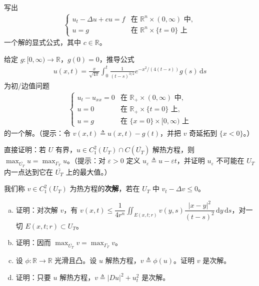 \documentclass[../../main.tex]{subfiles}
\begin{document}
\begin{exercise}\label{exercise:ch02-14}
写出
\begin{align*}
\begin{cases}
u_t-\Delta u+cu=f & \text{在 }\mathbb{R}^n\times(0,\infty)\text{ 中},\\
u=g & \text{在 }\mathbb{R}^n\times\{t=0\}\text{ 上}
\end{cases}
\end{align*}
一个解的显式公式，其中 $c\in\mathbb{R}$。
\end{exercise}

\begin{exercise}\label{exercise:ch02-15}
给定 $g:[0,\infty)\to\mathbb{R}$，$g(0)=0$，推导公式
\begin{align*}
u(x,t)=\frac{x}{\sqrt{4\pi}}\int_0^t\frac{1}{(t-s)^{3/2}}e^{-x^2/(4(t-s))}g(s)\,\mathrm{d}s
\end{align*}
为初/边值问题
\begin{align*}
\begin{cases}
u_t-u_{xx}=0 & \text{在 }\mathbb{R}_+\times(0,\infty)\text{ 中},\\
u=0 & \text{在 }\mathbb{R}_+\times\{t=0\}\text{ 上},\\
u=g & \text{在 }\{x=0\}\times[0,\infty)\text{ 上}
\end{cases}
\end{align*}
的一个解。（提示：令 $v(x,t)\triangleq u(x,t)-g(t)$，并把 $v$ 奇延拓到 $\{x<0\}$。）
\end{exercise}

\begin{exercise}\label{exercise:ch02-16}
直接证明：若 $U$ 有界，$u\in C^2_1(U_T)\cap C(\overline{U_T})$ 解热方程，则 $\max_{\overline{U_T}}u=\max_{\Gamma_T}u$。（提示：对 $\varepsilon>0$ 定义 $u_\varepsilon\triangleq u-\varepsilon t$，并证明 $u_\varepsilon$ 不可能在 $U_T$ 内一点达到它在 $\overline{U_T}$ 上的最大值。）
\end{exercise}

\begin{exercise}\label{exercise:ch02-17}
我们称 $v\in C^2_1(U_T)$ 为热方程的\textbf{次解}，若在 $U_T$ 中 $v_t-\Delta v\leqslant 0$。
\begin{enumerate}[(a)]
\item 证明：对次解 $v$，有 $v(x,t)\leqslant\dfrac{1}{4r^n}\displaystyle\iint_{E(x,t;r)}v(y,s)\dfrac{|x-y|^2}{(t-s)^2}\,\mathrm{d}y\,\mathrm{d}s$，对一切 $E(x,t;r)\subset U_T$。
\item 证明：因而 $\max_{\overline{U_T}}v=\max_{\Gamma_T}v$。
\item 设 $\phi:\mathbb{R}\to\mathbb{R}$ 光滑且凸。设 $u$ 解热方程，$v\triangleq\phi(u)$。证明 $v$ 是次解。
\item 证明：只要 $u$ 解热方程，$v\triangleq|Du|^2+u_t^2$ 是次解。
\end{enumerate}
\end{exercise}
\end{document}
